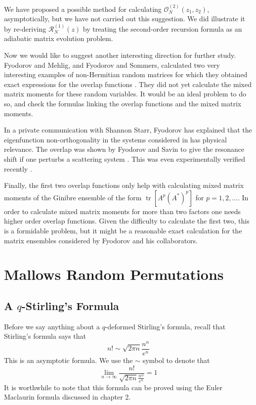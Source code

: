 \documentclass[12pt]{report}
\theoremstyle{definition}
\begin{document}
We have proposed a possible method for calculating $\mathcal{O}_N^{(2)}(z_1,z_2)$, asymptotically,
but we have not carried out this suggestion.
We did illustrate it by re-deriving $\mathcal{R}_N^{(1)}(z)$ by treating the second-order recursion formula
as an adiabatic matrix evolution problem.

Now we would like to suggest another interesting direction for further study.
Fyodorov and Mehlig, and Fyodorov and Sommers, calculated two very interesting examples
of non-Hermitian random matrices for which they obtained exact expressions for the overlap functions \cite{FY1,FY2}.
They did not yet calculate the mixed matrix moments for these random variables.
It would be an ideal problem to do so, and check the formulas linking the overlap functions and the mixed matrix moments.

In a private communication with Shannon Starr, Fyodorov has explained that the eigenfunction non-orthogonality
in the systems considered in \cite{FY1,FY2} has physical relevance.
The overlap was shown by Fyodorov and Savin to give the resonance shift if one perturbs a scattering
system \cite{FY3}.
This was even experimentally verified recently \cite{Gros}.

Finally, the first two overlap functions only help with calculating mixed matrix moments of the Ginibre ensemble of the 
form $\operatorname{tr}[A^p (A^*)^p]$ for $p=1,2,\dots$.
In order to calculate mixed matrix moments for more than two factors one needs higher order overlap functions.
Given the difficulty to calculate the first two, this is a formidable problem,
but it might be a reasonable exact calculation for the matrix ensembles considered by Fyodorov and his collaborators.


\chapter{Mallows Random Permutations}
\section{A $q$-Stirling's Formula}
Before we say anything about a $q$-deformed Stirling's formula, recall that Stirling's formula says that 
$$
n!\sim \sqrt{2\pi n}\frac{n^n}{e^n}
$$
This is an asymptotic formula.  We use the $\sim$ symbol to denote that 
$$
\lim_{n\rightarrow\infty} \frac{n!}{\sqrt{2\pi n}\frac{n^n}{e^n}}=1
$$
It is worthwhile to note that this formula can be proved using the Euler Maclaurin formula discussed in chapter 2.  
\end{document}
